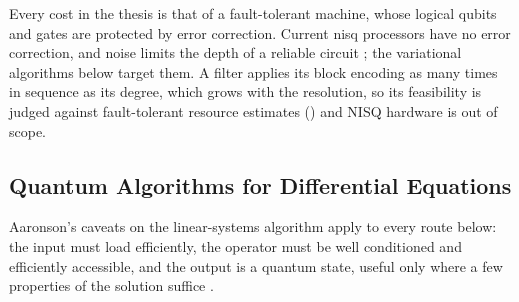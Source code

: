 Every cost in the thesis is that of a fault-tolerant machine, whose logical qubits and gates are protected by error correction. Current \gls{nisq} processors have no error correction, and noise limits the depth of a reliable circuit \cite{preskill2018nisq}; the variational algorithms below target them. A filter applies its block encoding as many times in sequence as its degree, which grows with the resolution, so its feasibility is judged against fault-tolerant resource estimates () and NISQ hardware is out of scope.

\subsection{Quantum Algorithms for Differential Equations}
\label{sec:bg-de}

Aaronson's caveats on the linear-systems algorithm apply to every route below: the input must load efficiently, the operator must be well conditioned and efficiently accessible, and the output is a quantum state, useful only where a few properties of the solution suffice \cite{aaronson2015fineprint}.

